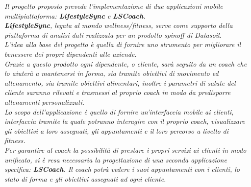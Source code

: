 \textit{
Il progetto proposto prevede l’implementazione di due applicazioni mobile multipiattaforma: \textbf{Lifestyle\textbf{Syn}c} e \textbf{LSCoach}.\\
\textbf{Lifestyle\textbf{Syn}c}, legata al mondo wellness/fitness, serve come supporto della piattaforma di analisi dati realizzata per un prodotto spinoff di Datasoil. \\
L'idea alla base del progetto è quella di fornire uno strumento per migliorare il benessere dei propri dipendenti alle aziende.\\
Grazie a questo prodotto ogni dipendente, o cliente, sarà seguito da un coach che lo aiuterà a mantenersi in forma, sia tramite obiettivi di movimento ed allenamento, sia tramite obiettivi alimentari, inoltre i parametri di salute del cliente saranno rilevati e trasmessi al proprio coach in modo da predisporre allenamenti personalizzati. \\
Lo scopo dell'applicazione è quello di fornire un'interfaccia mobile ai clienti, interfaccia tramite la quale potranno interagire con il proprio coach, visualizzare gli obiettivi a loro assegnati, gli appuntamenti e il loro percorso a livello di fitness.\\
Per garantire al coach la possibilità di prestare i propri servizi ai clienti in modo unificato, si è resa necessaria la progettazione di una seconda applicazione specifica: \textbf{LSCoach}. Il coach potrà vedere i suoi appuntamenti con i clienti, lo stato di forma e gli obiettivi assegnati ad ogni cliente.
}

